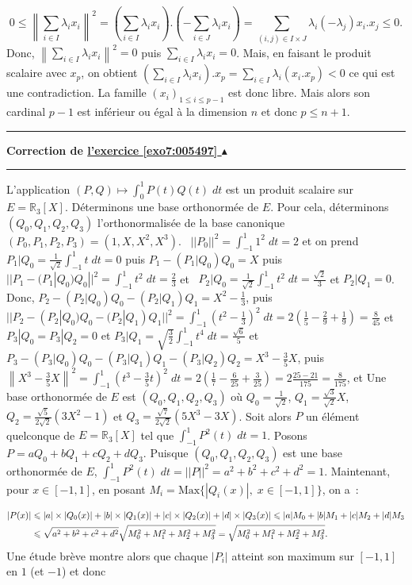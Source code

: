 \documentclass[11pt,a4paper]{article}
\newcommand{\Rr}{\mathbb{R}} \newcommand{\R}{\mathbb{R}}
\newcounter{exo}
\newcommand{\correction}[1]{\hypertarget{cor7:#1}{}\label{cor7:#1}{\bf Correction de \hyperlink{exo7:#1}{l'exercice \ref{exo7:#1} $\blacktriangle$}}\vspace{1mm}\hrule\vspace{1mm}}
\newcommand{\fincorrection}{\vspace{1mm}\hrule\vspace*{7mm}}
\begin{document}
$$0\leq\left\|\sum_{i\in I}^{}\lambda_ix_i\right\|^2=\left(\sum_{i\in I}^{}\lambda_ix_i\right).\left(-\sum_{i\in  J}^{}\lambda_ix_i\right)=\sum_{(i,j)\in I\times J}^{}\lambda_i(-\lambda_j)x_i.x_j\leq 0.$$
Donc, $\left\|\sum_{i\in I}^{}\lambda_ix_i\right\|^2=0$ puis $\sum_{i\in I}^{}\lambda_ix_i=0$.
Mais, en faisant le produit scalaire avec $x_p$, on obtient $\left(\sum_{i\in I}^{}\lambda_ix_i\right).x_p=\sum_{i\in I}^{}\lambda_i(x_i.x_p)<0$ ce qui est une contradiction.
La famille $(x_i)_{1\leq i\leq p-1}$ est donc libre. Mais alors son cardinal $p-1$ est inférieur ou égal à la dimension $n$ et donc $p\leq n+1$.
\fincorrection
\correction{005497}
L'application $(P,Q)\mapsto\int_{0}^{1}P(t)Q(t)\;dt$ est un produit scalaire sur $E=\Rr_3[X]$. Déterminons une base orthonormée de $E$. Pour cela, déterminons $(Q_0,Q_1,Q_2,Q_3)$ l'orthonormalisée de la base canonique $(P_0,P_1,P_2,P_3)=(1,X,X^2,X^3)$.
\textbullet~$||P_0||^2=\int_{-1}^{1}1^2\;dt=2$ et on prend 
\textbullet~$P_1|Q_0=\frac{1}{\sqrt{2}}\int_{-1}^{1}t\;dt=0$ puis $P_1-(P_1|Q_0)Q_0=X$ puis $||P_1-(P_1|Q_0)Q_0||^2=\int_{-1}^{1}t^2\;dt=\frac{2}{3}$ et 
\textbullet~$P_2|Q_0=\frac{1}{\sqrt{2}}\int_{-1}^{1}t^2\;dt=\frac{\sqrt{2}}{3}$ et $P_2|Q_1=0$. Donc, $P_2-(P_2|Q_0)Q_0-(P_2|Q_1)Q_1=X^2-\frac{1}{3}$,
puis $||P_2-(P_2|Q_0)Q_0-(P_2|Q_1)Q_1||^2=\int_{-1}^{1}\left(t^2-\frac{1}{3}\right)^2\;dt=2\left(\frac{1}{5}-\frac{2}{9}+\frac{1}{9}\right)=
\frac{8}{45}$ et 
\textbullet~$P_3|Q_0=P_3|Q_2=0$ et $P_3|Q_1=\sqrt{\frac{3}{2}}\int_{-1}^{1}t^4\;dt=\frac{\sqrt{6}}{5}$ et 
$P_3-(P_3|Q_0)Q_0-(P_3|Q_1)Q_1-(P_3|Q_2)Q_2=X^3-\frac{3}{5}X$,
puis $\left\|X^3-\frac{3}{5}X\right\|^2=\int_{-1}^{1}\left(t^3-\frac{3}{5}t\right)^2\;dt=2\left(\frac{1}{7}-\frac{6}{25}+\frac{3}{25}\right)=2\frac{25-21}{175}=\frac{8}{175}$, et 
Une base orthonormée de $E$ est $(Q_0,Q_1,Q_2,Q_3)$ où $Q_0=\frac{1}{\sqrt{2}}$, $Q_1=\frac{\sqrt{3}}{\sqrt{2}}X$, $Q_2=\frac{\sqrt{5}}{2\sqrt{2}}(3X^2-1)$ et $Q_3=\frac{\sqrt{7}}{2\sqrt{2}}(5X^3-3X)$.
Soit alors $P$ un élément quelconque de $E=\Rr_3[X]$ tel que $\int_{-1}^{1}P^2(t)\;dt=1$. Posons $P=aQ_0+bQ_1+cQ_2+dQ_3$.
Puisque $(Q_0,Q_1,Q_2,Q_3)$ est une base orthonormée de $E$, $\int_{-1}^{1}P^2(t)\;dt=||P||^2=a^2+b^2+c^2+d^2=1$. Maintenant, pour $x\in[-1,1]$, en posant $M_i=\mbox{Max}\{|Q_i(x)|,\;x\in[-1,1]\}$, on a~:

\begin{align*}\ensuremath
|P(x)|&\leq|a|\times|Q_0(x)|+|b|\times|Q_1(x)|+|c|\times|Q_2(x)|+|d|\times|Q_3(x)|\leq|a|M_0+|b|M_1+|c|M_2+|d|M_3\\
 &\leq\sqrt{a^2+b^2+c^2+d^2}\sqrt{M_0^2+M_1^2+M_2^2+M_3^2}=\sqrt{M_0^2+M_1^2+M_2^2+M_3^2}.
\end{align*}
Une étude brève montre alors que chaque $|P_i|$ atteint son maximum sur $[-1,1]$ en $1$ (et $-1$) et donc 
\end{document}
